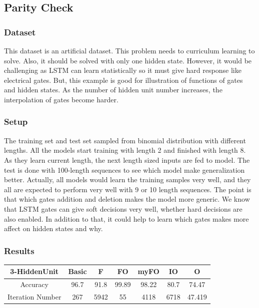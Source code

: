 \documentclass[12pt, letterpaper]{article}
\begin{document}
\subsection{Parity Check}
\subsubsection{Dataset}
	This dataset is an artificial dataset. This problem needs to curriculum learning to solve. Also, it should be solved with only one hidden state. However, it would be challenging as LSTM can learn statistically so it must give hard response like electrical gates. But, this example is good for illustration of functions of gates and hidden states. As the number of hidden unit number increases, the interpolation of gates become harder. 
\subsubsection{Setup}
	The training set and test set sampled from binomial distribution with different lengths. All the models start training with length 2 and finished with length 8. As they learn current length, the next length sized inputs are fed to model. The test is done with 100-length sequences to see which model make generalization better. Actually, all models would learn the training samples very well, and they all are expected to perform very well with 9 or 10 length sequences. The point is that which gates addition and deletion makes the model more generic. We know that LSTM gates can give soft decisions very well, whether hard decisions are also enabled. In addition to that, it could help to learn which gates makes more affect on hidden states and  why.
\subsubsection{Results}

\begin{center}
\begin{tabular}{ |c|c|c|c|c|c|c|  } 
 \hline
3-HiddenUnit & Basic  &  F     &  FO     & myFO  & IO    &    O  \\ \hline
Accuracy & 96.7   &  91.8  &  99.89  & 98.22  & 80.7  & 74.47 \\ \hline
Iteration Number & 267    &  5942  &   55    & 4118  	& 6718  & 47.419 \\
 \hline
\end{tabular}
\end{center}
\end{document}
